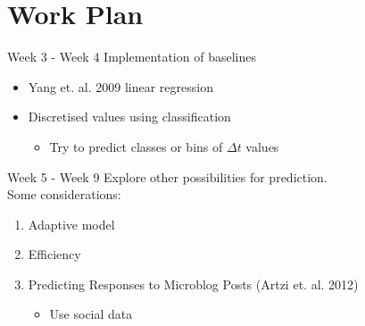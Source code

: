 \documentclass[compress]{beamer}
\begin{document}
\section{Work Plan}


\begin{frame}{Week 3 - Week 4}
	Implementation of baselines
	\begin{itemize}
		\item Yang et. al. 2009 linear regression
		\item Discretised values using classification
			\begin{itemize}
				\item Try to predict classes or bins of $\Delta t$ values
			\end{itemize}
	\end{itemize}
\end{frame}

\begin{frame}{Week 5 - Week 9}
	Explore other possibilities for prediction.\\
	Some considerations:
	\begin{enumerate}
		\item Adaptive model
		\item Efficiency
		\item Predicting Responses to Microblog Posts (Artzi et. al. 2012)
			\begin{itemize}
				\item Use social data
			\end{itemize}
	\end{enumerate}
\end{frame}
\end{document}
